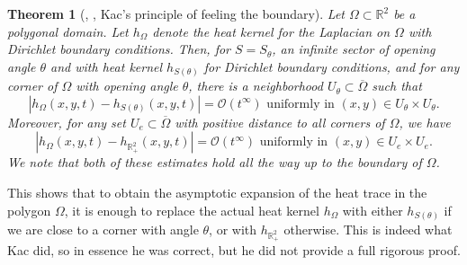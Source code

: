 \documentclass{amsart}
\newtheorem{theorem}{Theorem}[section]
\theoremstyle{definition}
\newcommand*{\R}{\mathbb{R}}
\begin{document}
\begin{theorem}[\cite{van1988heat}, \cite{nursultanov2019hear}, Kac's principle of feeling the boundary] \label{theorem:locality_principle}
    Let $\Omega \subset \R^2$ be a polygonal domain. Let $h_\Omega$ denote the heat kernel for the Laplacian on $\Omega$ with Dirichlet boundary conditions. Then, for $S = S_\theta$, an infinite sector of opening angle $\theta$ and with heat kernel $h_{S(\theta)}$ for Dirichlet boundary conditions, and for any corner of $\Omega$ with opening angle $\theta$, there is a neighborhood $U_\theta \subset \overline \Omega$ such  that 
    \begin{equation*}
        |h_\Omega(x,y,t) - h_{S(\theta)}(x,y,t)| = \mathcal{O}(t^\infty) \text{ uniformly in } (x,y) \in U_\theta \times U_\theta.
    \end{equation*}
    Moreover, for any set $U_e \subset \overline \Omega$ with positive distance to all corners of $\Omega$, we have
    \begin{equation*}
        |h_\Omega(x,y,t) - h_{\R_+^2}(x,y,t)| = \mathcal{O}(t^\infty) \text{ uniformly in } (x,y) \in U_e \times U_e. 
    \end{equation*} 
        We note that both of these estimates hold all the way up to the boundary of $\Omega$. 
\end{theorem} 
This shows that to obtain the asymptotic expansion of the heat trace in the polygon $\Omega$, it is enough to replace the actual heat kernel $h_\Omega$ with either $h_{S(\theta)}$ if we are close to a corner with angle $\theta$, or with $h_{\R_+^2}$ otherwise. This is indeed what Kac did, so in essence he was correct, but he did not provide a full rigorous proof.  
\end{document}
